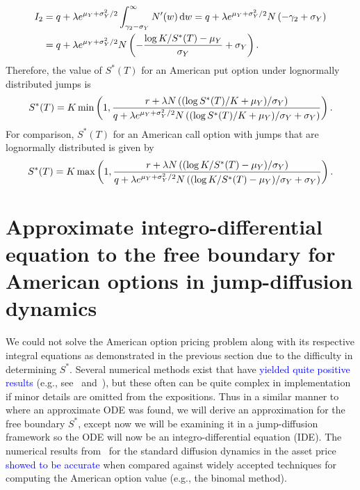 	\begin{align*}
		I_2 &= q + \lambda e^{\mu_Y+\sigma_Y^2/2}\int_{\gamma_2 - \sigma_Y}^\infty N'(w) \, \mathrm d w = q + \lambda e^{\mu_Y+\sigma_Y^2/2}N\left(-\gamma_2 + \sigma_Y \right) \\
		&= q + \lambda e^{\mu_Y+\sigma_Y^2/2}N\left(-\frac{\log K/S^*(T) - \mu_Y}{\sigma_Y} + \sigma_Y \right).
	\end{align*}
Therefore, the value of $S^*(T)$ for an American put option under lognormally distributed jumps is
	\begin{equation}
		\label{eqn:freePutTLN}
		S^*(T) = K\min\left( 1, \frac{r + \lambda N \left(  (\log S^*(T)/K + \mu_Y)/\sigma_Y  \right)}{q + \lambda e^{\mu_Y+\sigma_Y^2/2}N\left((\log S^*(T)/K + \mu_Y)/\sigma_Y + \sigma_Y \right)}\right).
	\end{equation}
For comparison, $S^*(T)$ for an American call option with jumps that are lognormally distributed is given by~\cite{Chiarella2006}
		\begin{equation}
		\label{eqn:freeCallTLN}
		S^*(T) = K\max\left( 1, \frac{r + \lambda N \left(  (\log K/S^*(T) - \mu_Y)/\sigma_Y  \right)}{q + \lambda e^{\mu_Y+\sigma_Y^2/2}N\left((\log K/S^*(T) - \mu_Y)/\sigma_Y + \sigma_Y \right)}\right).
	\end{equation}
        	
        	\section{Approximate integro-differential equation to the free boundary for American options in jump-diffusion dynamics}
        	We could not solve the American option pricing problem along with its respective integral equations as demonstrated in the previous section due to the difficulty in determining $S^*$. Several numerical methods exist that have \textcolor{blue}{yielded quite positive results} (e.g., see~\cite{Kallast2003} and~\cite{Chiarella2006}), but these often can be quite complex in implementation if minor details are omitted from the expositions. Thus in a similar manner to~\cite{Rodrigo2013} where an approximate ODE was found, we will derive an approximation for the free boundary $S^*$, except now we will be examining it in a jump-diffusion framework so the ODE will now be an integro-differential equation (IDE). The numerical results from~\cite{Rodrigo2013} for the standard diffusion dynamics in the asset price \textcolor{blue}{showed to be accurate} when compared against widely accepted techniques for computing the American option value (e.g., the binomal method).
        	
